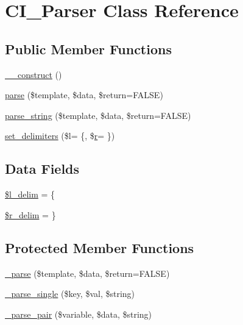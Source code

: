 \hypertarget{class_c_i___parser}{}\section{C\+I\+\_\+\+Parser Class Reference}
\label{class_c_i___parser}
\subsection*{Public Member Functions}
\begin{DoxyCompactItemize}
\item 
\hyperlink{class_c_i___parser_a095c5d389db211932136b53f25f39685}{\+\_\+\+\_\+construct} ()
\item 
\hyperlink{class_c_i___parser_aed3a838a4afdff95c4bf2b1fb5062cbd}{parse} (\$template, \$data, \$return=F\+A\+L\+S\+E)
\item 
\hyperlink{class_c_i___parser_a5cdfa809d6f2988d2741cb26b5a51d36}{parse\+\_\+string} (\$template, \$data, \$return=F\+A\+L\+S\+E)
\item 
\hyperlink{class_c_i___parser_a1865a64fc2d5187c9898abd7239a565b}{set\+\_\+delimiters} (\$l= \textquotesingle{}\{\textquotesingle{}, \$\hyperlink{assets_2js_2jquery-1_811_82_8min_8js_a96f65b399314d93896076ceb474b6b9b}{r}= \textquotesingle{}\}\textquotesingle{})
\end{DoxyCompactItemize}
\subsection*{Data Fields}
\begin{DoxyCompactItemize}
\item 
\hyperlink{class_c_i___parser_ab957da01a735e612795fba1c5802b1fb}{\$l\+\_\+delim} = \textquotesingle{}\{\textquotesingle{}
\item 
\hyperlink{class_c_i___parser_a4d80dc6a622989846dbd0e39fde0f3bb}{\$r\+\_\+delim} = \textquotesingle{}\}\textquotesingle{}
\end{DoxyCompactItemize}
\subsection*{Protected Member Functions}
\begin{DoxyCompactItemize}
\item 
\hyperlink{class_c_i___parser_a6bd5ad826db82a61de1f3a13031faaf9}{\+\_\+parse} (\$template, \$data, \$return=F\+A\+L\+S\+E)
\item 
\hyperlink{class_c_i___parser_a01c9bb8a5e8802a1b21acf829cc181e7}{\+\_\+parse\+\_\+single} (\$key, \$val, \$string)
\item 
\hyperlink{class_c_i___parser_a3f01fef88e49c40d679e35dedf89a128}{\+\_\+parse\+\_\+pair} (\$variable, \$data, \$string)
\end{DoxyCompactItemize}
